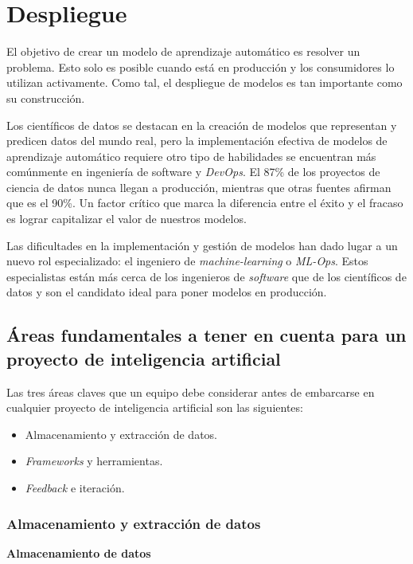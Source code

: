 \documentclass[a4paper,12pt]{article}
\begin{document}
		\clearpage
				
		\section{Despliegue} \label{ModelDeployment}
		El objetivo de crear un modelo de aprendizaje automático es resolver un problema. Esto solo es posible cuando está en producción y los consumidores lo utilizan activamente. Como tal, el despliegue de modelos es tan importante como su construcción.
				
		Los científicos de datos se destacan en la creación de modelos que representan y predicen datos del mundo real, pero la implementación efectiva de modelos de aprendizaje automático requiere otro tipo de habilidades se encuentran más comúnmente en ingeniería de software y \textit{DevOps}. El 87\% de los proyectos de ciencia de datos nunca llegan a producción, mientras que otras fuentes afirman que es el 90\%. \citep{RisingOdegua} Un factor crítico que marca la diferencia entre el éxito y el fracaso es lograr capitalizar el valor de nuestros modelos.
		
		Las dificultades en la implementación y gestión de modelos han dado lugar a un nuevo rol especializado: el ingeniero de \textit{machine-learning} o \textit{ML-Ops}. Estos especialistas están más cerca de los ingenieros de \textit{software} que de los científicos de datos y son el candidato ideal para poner modelos en producción.
		
		\subsection{Áreas fundamentales a tener en cuenta para un proyecto de inteligencia artificial} \label{section:criticalareasai}
		
		Las tres áreas claves que un equipo debe considerar antes de embarcarse en cualquier proyecto de inteligencia artificial son las siguientes:
		\begin{itemize}[noitemsep, topsep=2pt]
			\item Almacenamiento y extracción de datos.
			\item \textit{Frameworks} y herramientas.
			\item \textit{Feedback} e iteración.
		\end{itemize}
		
		\subsubsection{Almacenamiento y extracción de datos}
		\textbf{Almacenamiento de datos}
		
\end{document}

